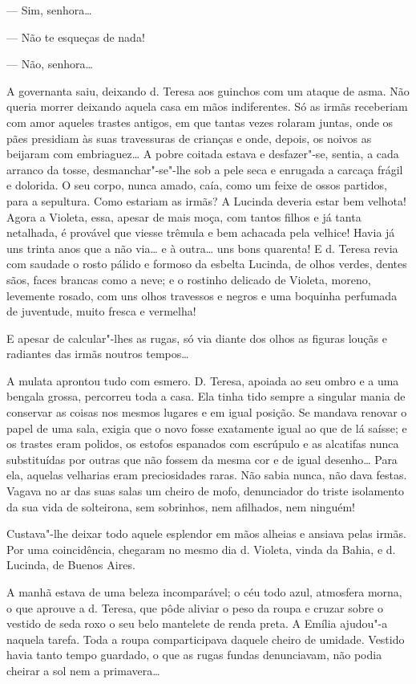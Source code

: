 --- Sim, senhora\ldots{}

--- Não te esqueças de nada!

--- Não, senhora\ldots{}

A governanta saiu, deixando d. Teresa aos guinchos com um ataque de
asma. Não queria morrer deixando aquela casa em mãos indiferentes. Só as
irmãs receberiam com amor aqueles trastes antigos, em que tantas vezes
rolaram juntas, onde os pães presidiam às suas travessuras de crianças e
onde, depois, os noivos as beijaram com embriaguez\ldots{} A pobre coitada
estava e desfazer"-se, sentia, a cada arranco da tosse, desmanchar"-se"-lhe
sob a pele seca e enrugada a carcaça frágil e dolorida. O seu corpo,
nunca amado, caía, como um feixe de ossos partidos, para a sepultura.
Como estariam as irmãs? A Lucinda deveria estar bem velhota! Agora a
Violeta, essa, apesar de mais moça, com tantos filhos e já tanta
netalhada, é provável que viesse trêmula e bem achacada pela velhice!
Havia já uns trinta anos que a não via\ldots{} e à outra\ldots{} uns bons
quarenta! E d. Teresa revia com saudade o rosto pálido e formoso da
esbelta Lucinda, de olhos verdes, dentes sãos, faces brancas como a
neve; e o rostinho delicado de Violeta, moreno, levemente rosado, com
uns olhos travessos e negros e uma boquinha perfumada de juventude,
muito fresca e vermelha!

E apesar de calcular"-lhes as rugas, só via diante dos olhos as figuras
louçãs e radiantes das irmãs noutros tempos\ldots{}

A mulata aprontou tudo com esmero. D. Teresa, apoiada ao seu ombro e a
uma bengala grossa, percorreu toda a casa. Ela tinha tido sempre a
singular mania de conservar as coisas nos mesmos lugares e em igual
posição. Se mandava renovar o papel de uma sala, exigia que o novo fosse
exatamente igual ao que de lá saísse; e os trastes eram polidos, os
estofos espanados com escrúpulo e as alcatifas nunca substituídas por
outras que não fossem da mesma cor e de igual desenho\ldots{} Para ela,
aquelas velharias eram preciosidades raras. Não sabia nunca, não dava
festas. Vagava no ar das suas salas um cheiro de mofo, denunciador do
triste isolamento da sua vida de solteirona, sem sobrinhos, nem
afilhados, nem ninguém!

Custava"-lhe deixar todo aquele esplendor em mãos alheias e ansiava pelas
irmãs. Por uma coincidência, chegaram no mesmo dia d. Violeta, vinda da
Bahia, e d. Lucinda, de Buenos Aires.

A manhã estava de uma beleza incomparável; o céu todo azul, atmosfera
morna, o que aprouve a d. Teresa, que pôde aliviar o peso da roupa e
cruzar sobre o vestido de seda roxo o seu belo mantelete de renda preta.
A Emília ajudou"-a naquela tarefa. Toda a roupa comparticipava daquele
cheiro de umidade. Vestido havia tanto tempo guardado, o que as rugas
fundas denunciavam, não podia cheirar a sol nem a primavera\ldots{}

